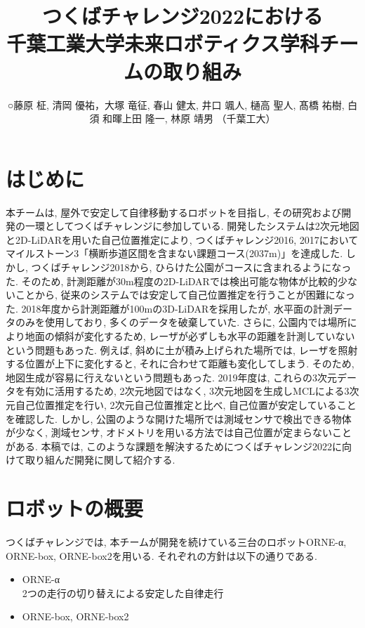 \documentclass[uplatex, twocolumn, 9pt]{jsproceedings}
\title{つくばチャレンジ2022における\\千葉工業大学未来ロボティクス学科チームの取り組み}
\author{○藤原 柾, 清岡 優祐，大塚 竜征, 春山 健太, 井口 颯人, 樋高 聖人, 髙橋 祐樹, 白須 和暉\newline 上田 隆一, 林原 靖男 （千葉工大）}
\affiliation{千葉工業大学未来ロボティクス学科チームα, box, box2}
\begin{document}
\maketitle


\section{はじめに}
本チームは, 屋外で安定して自律移動するロボットを目指し, その研究および開発の一環としてつくばチャレンジに参加している. 開発したシステムは2次元地図と2D-LiDARを用いた自己位置推定により, つくばチャレンジ2016, 2017においてマイルストーン3「横断歩道区間を含まない課題コース(2037m)」を達成した. しかし, つくばチャレンジ2018から, ひらけた公園がコースに含まれるようになった. そのため, 計測距離が30m程度の2D-LiDARでは検出可能な物体が比較的少ないことから, 従来のシステムでは安定して自己位置推定を行うことが困難になった. 2018年度から計測距離が100mの3D-LiDARを採用したが, 水平面の計測データのみを使用しており, 多くのデータを破棄していた. さらに, 公園内では場所により地面の傾斜が変化するため, レーザが必ずしも水平の距離を計測していないという問題もあった. 例えば, 斜めに土が積み上げられた場所では, レーザを照射する位置が上下に変化すると, それに合わせて距離も変化してしまう. そのため, 地図生成が容易に行えないという問題もあった. 2019年度は, これらの3次元データを有効に活用するため, 2次元地図ではなく, 3次元地図を生成しMCLによる3次元自己位置推定を行い, 2次元自己位置推定と比べ, 自己位置が安定していることを確認した. しかし, 公園のような開けた場所では測域センサで検出できる物体が少なく, 測域センサ, オドメトリを用いる方法では自己位置が定まらないことがある. 本稿では, このような課題を解決するためにつくばチャレンジ2022に向けて取り組んだ開発に関して紹介する. 

\section{ロボットの概要}
つくばチャレンジでは, 本チームが開発を続けている三台のロボットORNE-α, ORNE-box, ORNE-box2を用いる. それぞれの方針は以下の通りである. 
\begin{itemize}
  \item ORNE-α\\2つの走行の切り替えによる安定した自律走行
  \item ORNE-box, ORNE-box2\\ 
\end{itemize}
\end{document}
